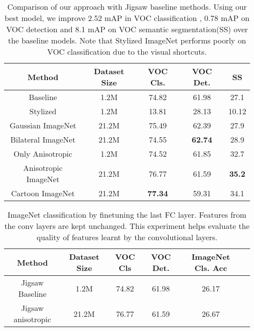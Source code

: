 \documentclass{bmvc2k}
\begin{document}
\begin{table*}
\begin{center}
\caption{Comparison of our approach with Jigsaw baseline methods. Using our best model, we improve 2.52 mAP in VOC classification , 0.78 mAP on VOC detection and 8.1 mAP on VOC semantic segmentation(SS) over the baseline models. Note that Stylized ImageNet performs poorly on VOC classification due to the visual shortcuts.}
\begin{tabular}{ccccc}  
\toprule
Method    & Dataset Size & VOC Cls. & VOC Det. & SS \\
\midrule
Baseline     & 1.2M & 74.82    & 61.98  & 27.1  \\
Stylized \cite{Geirhos2018ImageNettrainedCA}     & 1.2M & 13.81    & 28.13  &10.12   \\
Gaussian ImageNet & 21.2M    & 75.49    & 62.39    &27.9  \\
Bilateral ImageNet & 21.2M    & 74.55    & \textbf{62.74}    &28.9   \\
Only Anisotropic   & 1.2M & 74.52    & {61.85}  & 32.7     \\
Anisotropic ImageNet & 21.2M    & {76.77}    & 61.59   &\textbf{35.2}    \\
Cartoon ImageNet & 21.2M    & \textbf{77.34}    & 59.31   &  34.1\\
\bottomrule
\end{tabular}
\label{tab:Stylzied_Experiments}
\end{center}
\end{table*}
\begin{table*}[t!]
\caption{ImageNet classification by finetuning the last FC layer. Features from the conv layers are kept unchanged. This experiment helps evaluate the quality of features learnt by the convolutional layers.}
\vspace{-0.5em}
\begin{center}
{
\begin{tabular}{cccccc}  
\toprule
Method    & Dataset Size & VOC Cls & VOC Det. & ImageNet Cls. Acc \\
\midrule
Jigsaw Baseline     & 1.2M & 74.82    & 61.98  &26.17  \\
Jigsaw anisotropic   & 21.2M& 76.77    & 61.59  & 26.67    \\
\bottomrule
\end{tabular}
\label{ref:Jigsaw_Imgagenet_Experiments}
}
\vspace{-1em}
\end{center}
\end{table*}
\end{document}
